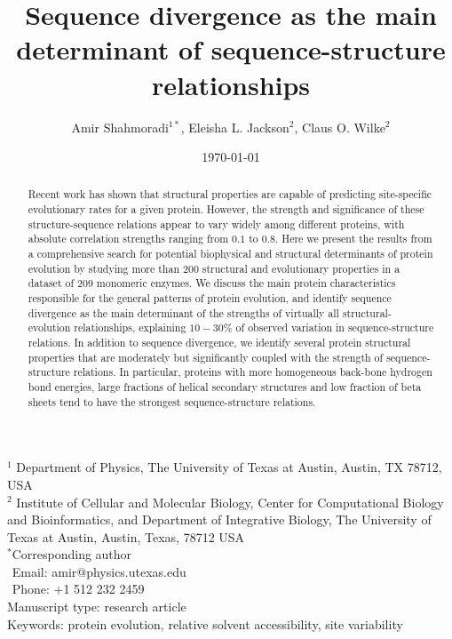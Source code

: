 \documentclass[12pt]{article}
\title{Sequence divergence as the main determinant of sequence-structure relationships}
\author{Amir Shahmoradi$^{1*}$, Eleisha L. Jackson$^2$, Claus O. Wilke$^2$}
\begin{document}
\date{\today}
\maketitle


\noindent
$^1$ Department of Physics, The University of Texas at Austin, Austin, TX 78712, USA \\
$^2$ Institute of Cellular and Molecular Biology, Center for Computational Biology and Bioinformatics, and Department of Integrative Biology, The University of Texas at Austin, Austin, Texas, 78712 USA\\

\bigskip
\noindent
$^*$Corresponding author\\
$\phantom{^*}$Email: amir@physics.utexas.edu\\
$\phantom{^*}$Phone: +1 512 232 2459\\

\bigskip
\noindent
Manuscript type: research article\\
\bigskip
\noindent  Keywords: protein evolution, relative solvent accessibility, site variability


\begin{abstract}
Recent work has shown that structural properties are capable of predicting site-specific evolutionary rates for a given protein. However, the strength and significance of these structure-sequence relations appear to vary widely among different proteins, with absolute correlation strengths ranging from $0.1$ to $0.8$. Here we present the results from a comprehensive search for potential biophysical and structural determinants of protein evolution by studying more than $200$ structural and evolutionary properties in a dataset of $209$ monomeric enzymes. We discuss the main protein characteristics responsible for the general patterns of protein evolution, and identify sequence divergence as the main determinant of the strengths of virtually all structural-evolution relationships, explaining $10-30 \%$ of observed variation in sequence-structure relations. In addition to sequence divergence, we identify several protein structural properties that are moderately but significantly coupled with the strength of sequence-structure relations. In particular, proteins with more homogeneous back-bone hydrogen bond energies, large fractions of helical secondary structures and low fraction of beta sheets tend to have the strongest sequence-structure relations.

\end{abstract}
\vfill
\vfill
\def\thefootnote{\fnsymbol{footnote}}
\setcounter{footnote}{0}
\end{document}
